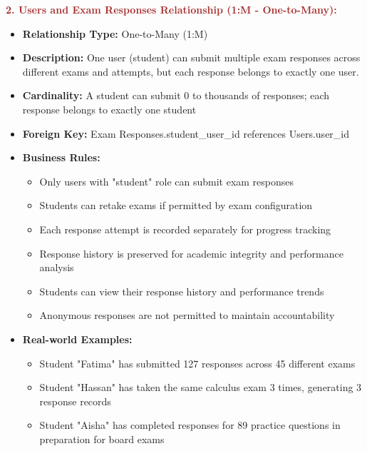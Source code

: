 \documentclass[12pt,a4paper,oneside]{book}
\begin{document}
\textbf{\textcolor{brown}{2. Users and Exam Responses Relationship (1:M - One-to-Many):}}
\begin{itemize}
    \item \textbf{Relationship Type:} One-to-Many (1:M)
    \item \textbf{Description:} One user (student) can submit multiple exam responses across different exams and attempts, but each response belongs to exactly one user.
    \item \textbf{Cardinality:} A student can submit 0 to thousands of responses; each response belongs to exactly one student
    \item \textbf{Foreign Key:} Exam Responses.student\_user\_id references Users.user\_id
    \item \textbf{Business Rules:}
        \begin{itemize}
            \item Only users with "student" role can submit exam responses
            \item Students can retake exams if permitted by exam configuration
            \item Each response attempt is recorded separately for progress tracking
            \item Response history is preserved for academic integrity and performance analysis
            \item Students can view their response history and performance trends
            \item Anonymous responses are not permitted to maintain accountability
        \end{itemize}
    \item \textbf{Real-world Examples:}
        \begin{itemize}
            \item Student "Fatima" has submitted 127 responses across 45 different exams
            \item Student "Hassan" has taken the same calculus exam 3 times, generating 3 response records
            \item Student "Aisha" has completed responses for 89 practice questions in preparation for board exams
        \end{itemize}
\end{itemize}
\end{document}
